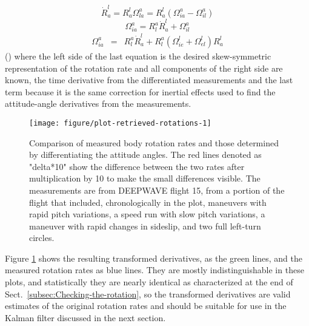 \documentclass[12pt,twoside,english,12pt,twoside,english]{article}\usepackage[]{graphicx}\usepackage[]{color}
\makeatletter
\def\maxwidth{ %
  \ifdim\Gin@nat@width>\linewidth
    \linewidth
  \else
    \Gin@nat@width
  \fi
}
\newenvironment{knitrout}{}{} %
\let\OrgIndex\index
\renewcommand*{\index}[1]{\OrgIndex{#1}}
\makeatother
\begin{document}
\begin{equation}
\dot{R}_{a}^{l}=R_{a}^{l}\Omega_{la}^{a}=R_{a}^{l}(\Omega_{ia}^{a}-\Omega_{il}^{a})\label{eq:Rla-dot}
\end{equation}
\begin{equation}
\Omega_{ia}^{a}=R_{l}^{a}\dot{R}_{a}^{l}+\Omega_{il}^{a}\label{eq:Omega-iaa}
\end{equation}
\begin{eqnarray}
\Omega_{ia}^{a} & = & R_{l}^{a}\dot{R}_{a}^{l}+R_{l}^{a}(\Omega_{ie}^{l}+\Omega_{el}^{l})R_{a}^{l}\label{eq:Omega2-iaa}
\end{eqnarray}
(\citet{noureldin2013fundamentals}) where the left side of the last
equation is the desired skew-symmetric representation of the rotation
rate and all components
of the right side are known, the time derivative
from the differentiated measurements
and the last term because it is the same correction for inertial effects
used to find the attitude-angle derivatives
from the measurements.

\begin{knitrout}
\color{fgcolor}\begin{figure}

{\centering \texttt{[image: figure/plot-retrieved-rotations-1]} 

}

\caption[Comparison of measured body rotation rates and those determined by differentiating the attitude angles, for a flight segment with various maneuvers.]{Comparison of measured body rotation rates and those determined by differentiating the attitude angles. The red lines denoted as "delta*10" show the difference between the two rates after multiplication by 10 to make the small differences visible. The measurements are from DEEPWAVE flight 15, from a portion of the flight that included, chronologically in the plot, maneuvers with rapid pitch variations, a speed run with slow pitch variations, a maneuver with rapid changes in sideslip, and two full left-turn circles.}\label{fig:plot-retrieved-rotations}
\end{figure}


\end{knitrout}

Figure \ref{fig:plot-retrieved-rotations}
shows the resulting transformed
derivatives, as the green lines, and
the measured rotation rates as blue lines. They are mostly indistinguishable
in these plots, and statistically they are nearly identical as characterized
at the end of Sect.~\ref{subsec:Checking-the-rotation}, so the transformed
derivatives are valid estimates of the original rotation rates and
should be suitable for use in the Kalman filter discussed in the next
section.
\end{document}
